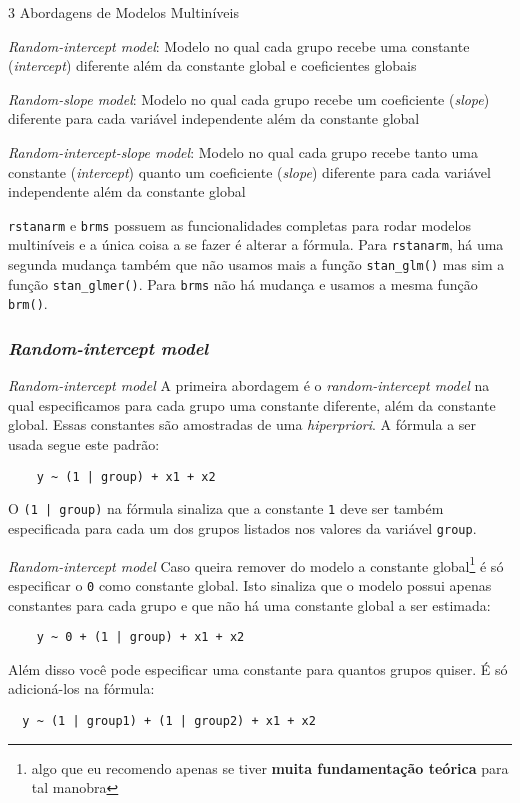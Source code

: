 \begin{frame}{3 Abordagens de Modelos Multiníveis}
	\begin{vfilleditems}
		\item \textit{Random-intercept model}: Modelo no qual cada grupo recebe uma
		constante (\textit{intercept}) diferente além da constante global e coeficientes
		globais
		\item \textit{Random-slope model}: Modelo no qual cada grupo recebe um coeficiente
		(\textit{slope}) diferente para cada variável independente além da constante global
		\item \textit{Random-intercept-slope model}: Modelo no qual cada grupo recebe tanto
		uma constante (\textit{intercept}) quanto um coeficiente (\textit{slope})
		diferente para cada variável independente além da constante global
	\end{vfilleditems}
	\small
	\texttt{rstanarm} e \texttt{brms} possuem as funcionalidades completas para rodar
	modelos multiníveis e a única coisa a se fazer é alterar a fórmula. Para
	\texttt{rstanarm}, há uma segunda mudança também que não usamos mais a função
	\texttt{stan\_glm()} mas sim a função \texttt{stan\_glmer()}. Para \texttt{brms}
	não há mudança e usamos a mesma função \texttt{brm()}.
\end{frame}

\subsubsection{\textit{Random-intercept model}}
\begin{frame}[fragile]{\textit{Random-intercept model}}
	A primeira abordagem é o \textit{random-intercept model} na qual especificamos
	para cada grupo uma constante diferente, além da constante global. Essas constantes
	são amostradas de uma \textit{hiperpriori}.
	\vfill
	A fórmula a ser usada segue este padrão:
	\begin{lstlisting}
    y ~ (1 | group) + x1 + x2
  \end{lstlisting}
	\vfill
	O \texttt{(1 | group)} na fórmula sinaliza que a constante \texttt{1}
	deve ser também especificada para cada um dos grupos listados nos valores
	da variável \texttt{group}.
\end{frame}

\begin{frame}[fragile]{\textit{Random-intercept model}}
	Caso queira remover do modelo a constante global\footnote{algo que eu recomendo
		apenas se tiver \textbf{muita fundamentação teórica} para tal manobra}
	é só especificar o \texttt{0} como constante global. Isto sinaliza que o modelo
	possui apenas constantes para cada grupo e que não há uma constante global a
	ser estimada:
	\begin{lstlisting}
    y ~ 0 + (1 | group) + x1 + x2
  \end{lstlisting}
	\vfill
	Além disso você pode especificar uma constante para quantos grupos quiser.
	É só adicioná-los na fórmula:
	\begin{lstlisting}
  y ~ (1 | group1) + (1 | group2) + x1 + x2
  \end{lstlisting}
\end{frame}

